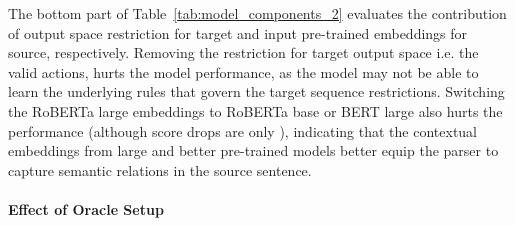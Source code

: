 The bottom part of Table~\ref{tab:model_components_2} evaluates the contribution of output space restriction for target and input pre-trained embeddings for source, respectively. Removing the restriction for target output space i.e. the valid actions, hurts the model performance, as the model may not be able to learn the underlying rules that govern the target sequence restrictions. Switching the RoBERTa large embeddings to RoBERTa base or BERT large also hurts the performance (although score drops are only ), indicating that the contextual embeddings from large and better pre-trained models better equip the parser to capture semantic relations in the source sentence.

\begin{table}[!t]
    \centering
     \caption{Results of model performance with different data oracles on AMR 2.0 corpus.}
    \label{tab:transition_oblation}
\end{table}


\paragraph{Effect of Oracle Setup}


